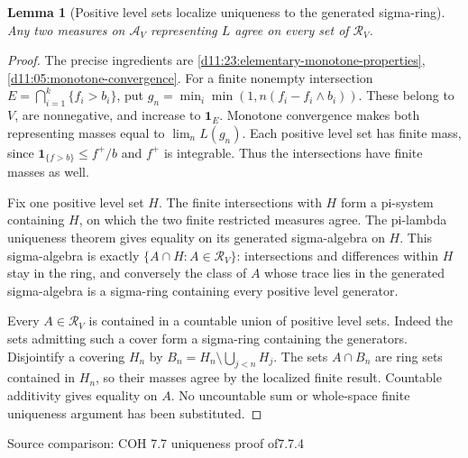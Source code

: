 \documentclass[11pt,oneside,openany]{book}
\newtheorem{lemma}[theorem]{Lemma}
\theoremstyle{definition}
\theoremstyle{remark}
\newcommand{\one}{\mathbf1}\newcommand{\ind}[1]{\mathbf1_{#1}}
\newcommand{\family}[1]{}
\newcommand{\source}[1]{\par\begingroup\small\sffamily\color{black!65}Source comparison: #1\par\endgroup}
\begin{document}
\begin{lemma}[Positive level sets localize uniqueness to the generated sigma-ring]\family{D11.23.localized_sigma_ring_uniqueness}\label{d11:23:localized-sigma-ring-uniqueness}
Any two measures on $\mathcal A_V$ representing $L$ agree on every set of $\mathcal R_V$.
\end{lemma}
\begin{proof}
The precise ingredients are \cref{d11:23:elementary-monotone-properties}, \cref{d11:05:monotone-convergence}. For a finite nonempty intersection $E=\bigcap_{i=1}^k\{f_i>b_i\}$, put
$g_n=\min_i\min(1,n(f_i-f_i\wedge b_i))$.
These belong to $V$, are nonnegative, and increase to $\one_E$. Monotone convergence makes both representing masses equal to $\lim_nL(g_n)$. Each positive level set has finite mass, since $\one_{\{f>b\}}\le f^+/b$ and $f^+$ is integrable. Thus the intersections have finite masses as well.

Fix one positive level set $H$. The finite intersections with $H$ form a pi-system containing $H$, on which the two finite restricted measures agree. The pi-lambda uniqueness theorem gives equality on its generated sigma-algebra on $H$. This sigma-algebra is exactly $\{A\cap H:A\in\mathcal R_V\}$: intersections and differences within $H$ stay in the ring, and conversely the class of $A$ whose trace lies in the generated sigma-algebra is a sigma-ring containing every positive level generator.

Every $A\in\mathcal R_V$ is contained in a countable union of positive level sets. Indeed the sets admitting such a cover form a sigma-ring containing the generators. Disjointify a covering $H_n$ by $B_n=H_n\setminus\bigcup_{j<n}H_j$. The sets $A\cap B_n$ are ring sets contained in $H_n$, so their masses agree by the localized finite result. Countable additivity gives equality on $A$. No uncountable sum or whole-space finite uniqueness argument has been substituted.
\end{proof}
\source{COH 7.7 uniqueness proof of7.7.4}
\end{document}

